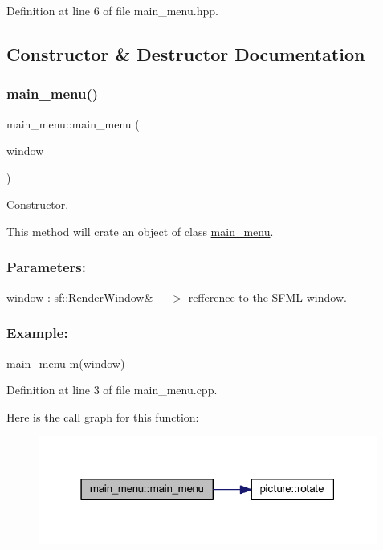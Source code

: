 Definition at line 6 of file main\+\_\+menu.\+hpp.



\subsection{Constructor \& Destructor Documentation}
\mbox{\label{classmain__menu_a4b0f9ffe66384d5e424a2d353371d84b}} 
\subsubsection{\texorpdfstring{main\+\_\+menu()}{main\_menu()}}
{\footnotesize\ttfamily main\+\_\+menu\+::main\+\_\+menu (\begin{DoxyParamCaption}\item[{sf\+::\+Render\+Window \&}]{window }\end{DoxyParamCaption})}



Constructor. 

This method will crate an object of class \hyperlink{classmain__menu}{main\+\_\+menu}.~\newline


\subsubsection*{Parameters\+: }

window \+: sf\+::\+Render\+Window\& ~\newline
-\/$>$ refference to the S\+F\+ML window.~\newline


\subsubsection*{Example\+: }

\hyperlink{classmain__menu}{main\+\_\+menu} m(window)~\newline


Definition at line 3 of file main\+\_\+menu.\+cpp.

Here is the call graph for this function\+:
\nopagebreak
\begin{figure}[H]
\begin{center}
\leavevmode
\includegraphics[width=316pt]{classmain__menu_a4b0f9ffe66384d5e424a2d353371d84b_cgraph}
\end{center}
\end{figure}


